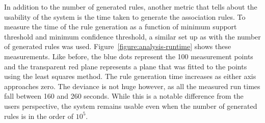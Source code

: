 In addition to the number of generated rules, another metric that tells about the usability of the system is the time taken to generate the association rules. To measure the time of the rule generation as a function of minimum support threshold and minimum confidence threshold, a similar set up as with the number of generated rules was used. Figure~\ref{figure:analysis-runtime} shows these measurements. Like before, the blue dots represent the 100 measurement points and the transparent red plane represents a plane that was fitted to the points using the least squares method. The rule generation time increases as either axis approaches zero. The deviance is not huge however, as all the measured run times fall between 160 and 260 seconds. While this is a notable difference from the users perspective, the system remains usable even when the number of generated rules is in the order of $10^5$.   

